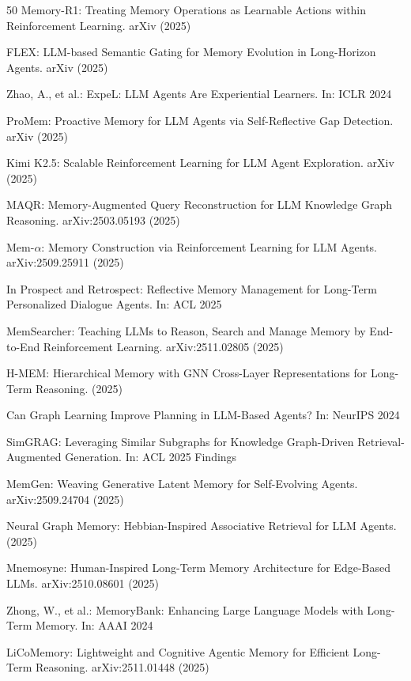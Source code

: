 \documentclass[hf]{ceurart}
\begin{document}
\begin{thebibliography}{50}
Memory-R1: Treating Memory Operations as Learnable Actions within
Reinforcement Learning. arXiv (2025)

FLEX: LLM-based Semantic Gating for Memory Evolution in Long-Horizon
Agents. arXiv (2025)

Zhao, A., et al.: ExpeL: LLM Agents Are Experiential Learners.
In: ICLR 2024

ProMem: Proactive Memory for LLM Agents via Self-Reflective Gap
Detection. arXiv (2025)

Kimi K2.5: Scalable Reinforcement Learning for LLM Agent Exploration.
arXiv (2025)

MAQR: Memory-Augmented Query Reconstruction for LLM Knowledge Graph
Reasoning. arXiv:2503.05193 (2025)

Mem-$\alpha$: Memory Construction via Reinforcement Learning for
LLM Agents. arXiv:2509.25911 (2025)

In Prospect and Retrospect: Reflective Memory Management for Long-Term
Personalized Dialogue Agents. In: ACL 2025

MemSearcher: Teaching LLMs to Reason, Search and Manage Memory by
End-to-End Reinforcement Learning. arXiv:2511.02805 (2025)

H-MEM: Hierarchical Memory with GNN Cross-Layer Representations for
Long-Term Reasoning. (2025)

Can Graph Learning Improve Planning in LLM-Based Agents?
In: NeurIPS 2024

SimGRAG: Leveraging Similar Subgraphs for Knowledge Graph-Driven
Retrieval-Augmented Generation. In: ACL 2025 Findings

MemGen: Weaving Generative Latent Memory for Self-Evolving Agents.
arXiv:2509.24704 (2025)

Neural Graph Memory: Hebbian-Inspired Associative Retrieval for
LLM Agents. (2025)

Mnemosyne: Human-Inspired Long-Term Memory Architecture for
Edge-Based LLMs. arXiv:2510.08601 (2025)

Zhong, W., et al.: MemoryBank: Enhancing Large Language Models with
Long-Term Memory. In: AAAI 2024

LiCoMemory: Lightweight and Cognitive Agentic Memory for Efficient
Long-Term Reasoning. arXiv:2511.01448 (2025)


\end{thebibliography}
\end{document}

